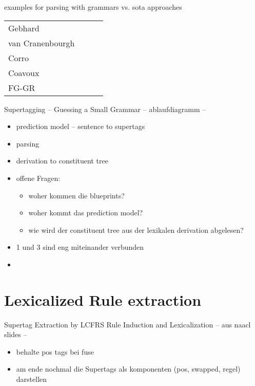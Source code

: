 \documentclass[aspectratio=169, 10pt]{beamer}
\begin{document}
\begin{frame}
        examples for parsing with grammars vs. sota approaches
        \begin{tabular}{lccc}
            \toprule
            \midrule
            Gebhard\\
            van Cranenbourgh\\
            \midrule
            Corro\\
            Coavoux\\
            FG-GR\\
            \bottomrule
        \end{tabular}
    \end{frame}


    \begin{frame}{Supertagging -- Guessing a Small Grammar}
        -- ablaufdiagramm --
        \begin{itemize}
            \item prediction model -- sentence to supertags
            \item parsing
            \item derivation to constituent tree
            \item offene Fragen:
            \begin{itemize}
                \item woher kommen die blueprints?
                \item woher kommt das prediction model?
                \item wie wird der constituent tree aus der lexikalen derivation abgelesen?
            \end{itemize}
            \item 1 und 3 sind eng miteinander verbunden
            \item
        \end{itemize}
    \end{frame}


    \section{Lexicalized Rule extraction}
    \begin{frame}{Supertag Extraction by LCFRS Rule Induction and Lexicalization}
        -- aus naacl slides --
        \begin{itemize}
            \item behalte pos tags bei fuse
            \item am ende nochmal die Supertags als komponenten (pos, swapped, regel) darstellen
        \end{itemize}
    \end{frame}
\end{document}

